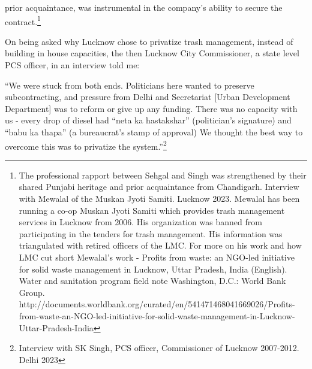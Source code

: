 prior acquaintance, was instrumental in the company's ability to secure the contract.\footnote{The professional rapport between Sehgal and Singh was strengthened by their shared Punjabi heritage and prior acquaintance from Chandigarh. Interview with Mewalal of the Muskan Jyoti Samiti. Lucknow 2023. Mewalal has been running a co-op Muskan Jyoti Samiti which provides trash management services in Lucknow from 2006. His organization was banned from participating in the tenders for trash management. His information was triangulated with retired officers of the LMC. For more on his work and how LMC cut short Mewalal's work - Profits from waste: an NGO-led initiative for solid waste management in Lucknow, Uttar Pradesh, India (English). Water and sanitation program field note Washington, D.C.: World Bank Group. http://documents.worldbank.org/curated/en/541471468041669026/Profits-from-waste-an-NGO-led-initiative-for-solid-waste-management-in-Lucknow-Uttar-Pradesh-India}

On being asked why Lucknow chose to privatize trash management, instead of building in house capacities, the then Lucknow City Commissioner, a state level PCS officer, in an interview told me:

``We were stuck from both ends. Politicians here wanted to preserve subcontracting, and pressure from Delhi and Secretariat [Urban Development Department] was to reform or give up any funding. There was no capacity with us - every drop of diesel had ``neta ka hastakshar'' (politician's signature) and ``babu ka thapa'' (a bureaucrat's stamp of approval) We thought the best way to overcome this was to privatize the system.''\footnote{Interview with SK Singh, PCS officer, Commissioner of Lucknow 2007-2012. Delhi 2023}

